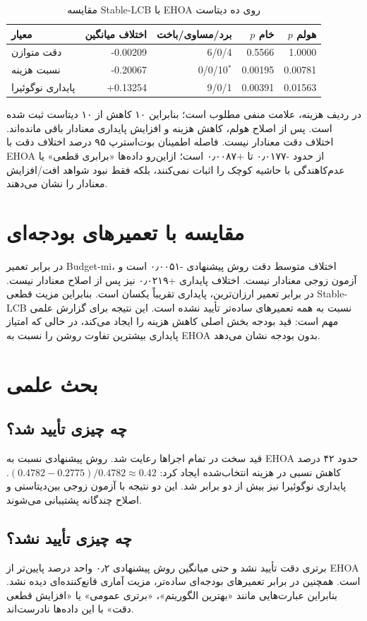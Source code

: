 \documentclass[12pt,a4paper]{article}
\newcommand{\lr}[1]{\foreignlanguage{english}{#1}}
\begin{document}
\begin{table}[h]\centering\caption{مقایسه \lr{Stable-LCB} با EHOA روی ده دیتاست}
\begin{tabular}{lrrrr}\toprule معیار & اختلاف میانگین & برد/مساوی/باخت & $p$ خام & $p$ هولم\\\midrule
دقت متوازن & -0.00209 & 6/0/4 & 0.5566 & 1.0000\\
نسبت هزینه & -0.20067 & 0/0/10$^*$ & 0.00195 & 0.00781\\
پایداری نوگوئیرا & +0.13254 & 9/0/1 & 0.00391 & 0.01563\\\bottomrule
\end{tabular}\end{table}
در ردیف هزینه، علامت منفی مطلوب است؛ بنابراین ۱۰ کاهش از ۱۰ دیتاست ثبت شده است. پس از اصلاح هولم، کاهش هزینه و افزایش پایداری معنادار باقی مانده‌اند. اختلاف دقت معنادار نیست. فاصله اطمینان بوت‌استرپ ۹۵ درصد اختلاف دقت با EHOA از حدود -۰٫۰۱۷۷ تا +۰٫۰۰۸۷ است؛ ازاین‌رو داده‌ها «برابری قطعی» یا عدم‌کاهندگی با حاشیه کوچک را اثبات نمی‌کنند، بلکه فقط نبود شواهد افت/افزایش معنادار را نشان می‌دهند.

\section{مقایسه با تعمیرهای بودجه‌ای}
در برابر تعمیر \lr{Budget-mi}، اختلاف متوسط دقت روش پیشنهادی -۰٫۰۰۵۱ است و آزمون زوجی معنادار نیست. اختلاف پایداری +۰٫۰۲۱۹ نیز پس از اصلاح معنادار نیست. در برابر تعمیر ارزان‌ترین، پایداری تقریباً یکسان است. بنابراین مزیت قطعی \lr{Stable-LCB} نسبت به همه تعمیرهای ساده‌تر تأیید نشده است. این نتیجه برای گزارش علمی مهم است: قید بودجه بخش اصلی کاهش هزینه را ایجاد می‌کند، در حالی که امتیاز پایداری بیشترین تفاوت روشن را نسبت به EHOA بدون بودجه نشان می‌دهد.

\section{بحث علمی}
\subsection{چه چیزی تأیید شد؟}
قید سخت در تمام اجراها رعایت شد. روش پیشنهادی نسبت به EHOA حدود ۴۲ درصد کاهش نسبی در هزینه انتخاب‌شده ایجاد کرد: $(0.4782-0.2775)/0.4782\approx 0.42$. پایداری نوگوئیرا نیز بیش از دو برابر شد. این دو نتیجه با آزمون زوجی بین‌دیتاستی و اصلاح چندگانه پشتیبانی می‌شوند.

\subsection{چه چیزی تأیید نشد؟}
برتری دقت تأیید نشد و حتی میانگین روش پیشنهادی ۰٫۲ واحد درصد پایین‌تر از EHOA است. همچنین در برابر تعمیرهای بودجه‌ای ساده‌تر، مزیت آماری قانع‌کننده‌ای دیده نشد. بنابراین عبارت‌هایی مانند «بهترین الگوریتم»، «برتری عمومی» یا «افزایش قطعی دقت» با این داده‌ها نادرست‌اند.
\end{document}

